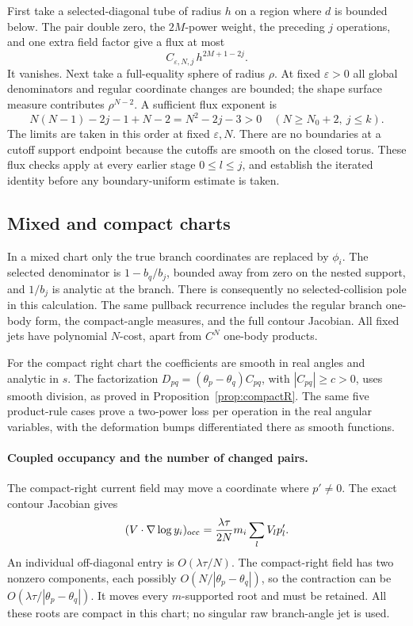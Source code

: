 \documentclass[11pt]{article}
\numberwithin{equation}{section}
\theoremstyle{definition}
\newcommand{\eps}{\varepsilon}
\begin{document}
First take a selected-diagonal tube of radius \(h\) on a region
where \(d\) is bounded below. The pair double zero, the
\(2M\)-power weight, the preceding \(j\) operations, and one
extra field factor give a flux at most
\[
 C_{\eps,N,j}\,h^{2M+1-2j}.
\]
It vanishes. Next take a full-equality sphere of radius \(\rho\).
At fixed \(\eps>0\) all global denominators and regular coordinate
changes are bounded; the shape surface measure contributes
\(\rho^{N-2}\). A sufficient flux exponent is
\[
 N(N-1)-2j-1+N-2=N^2-2j-3>0
 \quad(N\ge N_0+2,\ j\le k).
\]
The limits are taken in this order at fixed \(\eps,N\).
There are no boundaries at a cutoff support endpoint because
the cutoffs are smooth on the closed torus. These flux checks
apply at every earlier stage \(0\le l\le j\), and establish the
iterated identity before any boundary-uniform estimate is taken.

\subsection{Mixed and compact charts}
In a mixed chart only the true branch coordinates are replaced
by \(\phi_i\). The selected denominator is \(1-b_q/b_j\), bounded
away from zero on the nested support, and \(1/b_j\) is analytic
at the branch. There is consequently no selected-collision pole
in this calculation. The same pullback recurrence includes the
regular branch one-body form, the compact-angle measures, and
the full contour Jacobian. All fixed jets have polynomial
\(N\)-cost, apart from \(C^N\) one-body products.

For the compact right chart the coefficients are smooth in real
angles and analytic in \(s\). The factorization
\(D_{pq}=(\theta_p-\theta_q)C_{pq}\), with \(|C_{pq}|\ge c>0\),
uses smooth division, as proved in Proposition~\ref{prop:compactR}.
The same five product-rule cases prove a two-power loss per
operation in the real angular variables, with the deformation bumps
differentiated there as smooth functions.

\paragraph{Coupled occupancy and the number of changed pairs.}
The compact-right current field may move a coordinate where
\(p'\ne0\). The exact contour Jacobian gives
\[
 (V\cdot\nabla\log y_i)_{\rm occ}
   =\frac{\lambda\tau}{2N}m_i\sum_l V_l p'_l.
\]
An individual off-diagonal entry is \(O(\lambda\tau/N)\).
The compact-right field has two nonzero components, each possibly
\(O(N/|\theta_p-\theta_q|)\), so the contraction can be
\(O(\lambda\tau/|\theta_p-\theta_q|)\). It moves every
\(m\)-supported root and must be retained. All these roots are
compact in this chart; no singular raw branch-angle jet is used.
\end{document}
